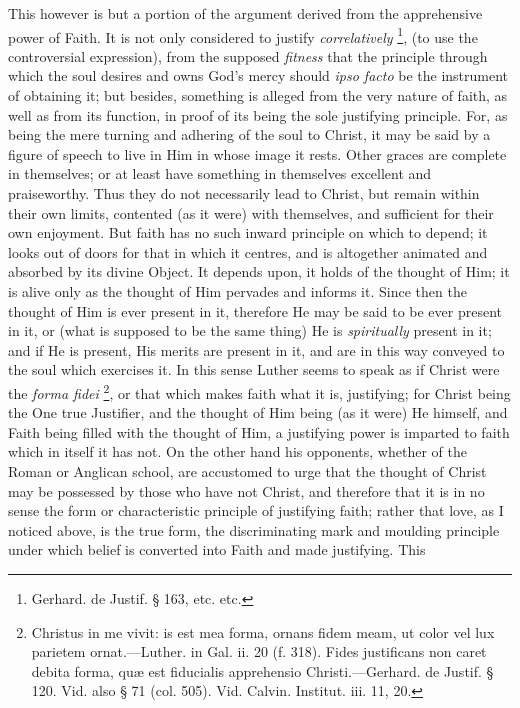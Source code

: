 This however is but a portion of the argument derived from the
apprehensive power of Faith. It is not only considered to justify
\emph{correlatively} \footnote{Gerhard. de
Justif. § 163, etc. etc.}, (to use the controversial expression),
from the supposed \emph{fitness} that the principle through which the
soul desires and owns God's mercy should \emph{ipso facto} be the
instrument of obtaining it; but besides, something is alleged from the
very nature of faith, as well as from its function, in proof of its
being the sole justifying principle. For, as being the mere turning
and adhering of the soul to Christ, it may be said by a figure of
speech to live in Him in whose image it rests. Other graces are
complete in themselves; or at least have something in themselves
excellent and praiseworthy. Thus they do not necessarily lead to
Christ, but remain within their own limits, contented (as it were)
with themselves, and sufficient for their own enjoyment. But faith has
no such inward principle on which to depend; it looks out of doors for
that in which it centres, and is altogether animated and absorbed by
its divine Object. It depends upon, it holds of the thought of Him; it
is alive only as the thought of Him pervades and informs it. Since
then the thought of Him is ever present in it, therefore He may be
said to be ever present in it, or (what is supposed to be the same
thing) He is \emph{spiritually} present in it; and if He is present,
His merits are present in it, and are in this way conveyed to the soul
which exercises it. In this sense Luther seems to speak as if Christ
were the \emph{forma fidei} \footnote{Christus in me
vivit: is est mea forma, ornans fidem meam, ut color vel lux parietem
ornat.—Luther. in Gal. ii. 20 (f. 318). Fides justificans non caret
debita forma, quæ est fiducialis apprehensio Christi.—Gerhard. de
Justif. § 120. Vid. also § 71 (col. 505). Vid. Calvin. Institut.
iii. 11, 20.}, or that which makes faith what
it is, justifying; for Christ being the One true Justifier, and
the thought of Him being (as it were) He himself, and Faith being
filled with the thought of Him, a justifying power is imparted to
faith which in itself it has not. On the other hand his opponents,
whether of the Roman or Anglican school, are accustomed to urge that
the thought of Christ may be possessed by those who have not Christ,
and therefore that it is in no sense the form or characteristic
principle of justifying faith; rather that love, as I noticed above,
is the true form, the discriminating mark and moulding principle under
which belief is converted into Faith and made justifying. This
